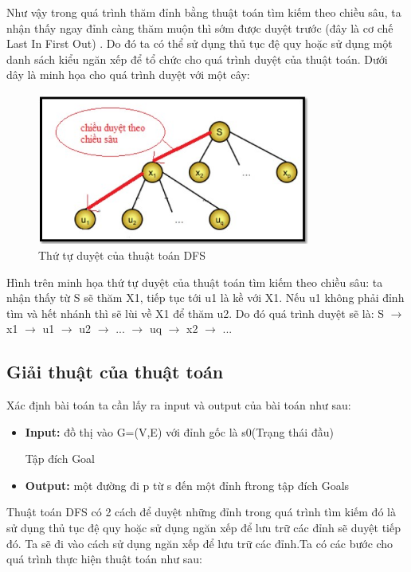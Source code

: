 Như vậy trong quá trình thăm đỉnh bằng thuật toán tìm kiếm theo chiều sâu, ta
nhận thấy ngay đỉnh càng thăm muộn thì sớm được duyệt trước (đây là cơ chế Last
In First Out) . Do đó ta có thể sử dụng thủ tục đệ quy hoặc sử dụng một danh sách
kiểu ngăn xếp để tổ chức cho quá trình duyệt của thuật toán. Dưới dây là minh họa
cho quá trình duyệt với một cây:

\begin{figure}[h!]
	\centering
	\includegraphics[width=0.8\textwidth]{
		Figures/figs/ThuTuDFS.jpg
	}
	\caption[Thứ tự duyệt của thuật toán DFS]{
		Thứ tự duyệt của thuật toán DFS 
	}
	\label{fig:hinha}
\end{figure}


Hình trên minh họa thứ tự duyệt của thuật toán tìm kiếm theo chiều sâu: ta nhận
thấy từ S sẽ thăm X1, tiếp tục tới u1 là kề với X1. Nếu u1 không phải đỉnh tìm và hết nhánh thì sẽ lùi về X1 để thăm u2. Do đó quá trình duyệt sẽ là: S $\to$ x1 $\to$ u1 $\to$ u2 $\to$ ... $\to$ uq $\to$ x2 $\to$ ...

\subsection{Giải thuật của thuật toán}
Xác định bài toán ta cần lấy ra input và output của bài toán như sau:
\begin{itemize}
	\item \textbf{Input:} đồ thị vào G=(V,E) với đỉnh gốc là s0(Trạng thái đầu)
	
	Tập đích Goal
	\item \textbf{Output:} một đường đi p từ s đến một đỉnh ftrong tập đích Goals
\end{itemize}

Thuật toán DFS có 2 cách để duyệt những đỉnh trong quá trình tìm kiếm đó là sử
dụng thủ tục đệ quy hoặc sử dụng ngăn xếp để lưu trữ các đỉnh sẽ duyệt tiếp đó. Ta
sẽ đi vào cách sử dụng ngăn xếp để lưu trữ các đỉnh.Ta có các bước cho quá trình
thực hiện thuật toán như sau:

